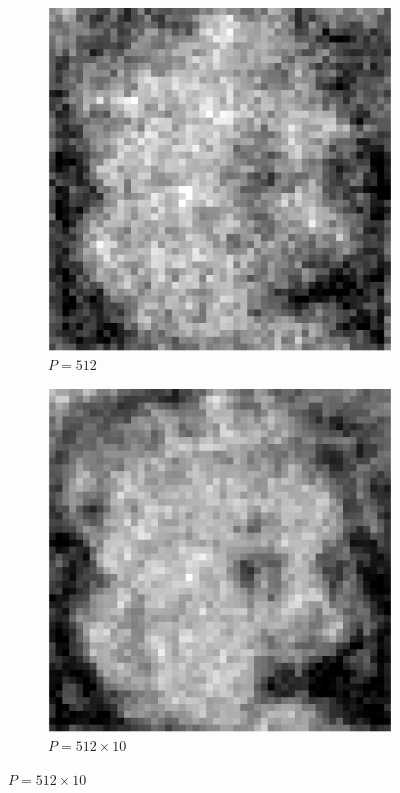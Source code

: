 \documentclass[english,11pt]{article}
\newcommand{\1}{\mathbf{1}}
\numberwithin{equation}{section}
\theoremstyle{plain}
\theoremstyle{definition}
\theoremstyle{remark}
\theoremstyle{plain}
\theoremstyle{remark}
\theoremstyle{plain}
\theoremstyle{plain}
\begin{document}
\begin{figure}[h!]
	\centering
	\begin{subfigure}[h]{0.45\textwidth}
		\centering
		\includegraphics[scale=0.45]{reconstruction1_cropped}
		\caption{\small $P = 512$}
	\end{subfigure}%
	\begin{subfigure}[h]{0.45\textwidth}
		\centering
		\includegraphics[scale=0.45]{reconstruction10_cropped}
		\caption{\small $P = 512\times 10$}
	\end{subfigure}%


\end{figure}
\end{document}
